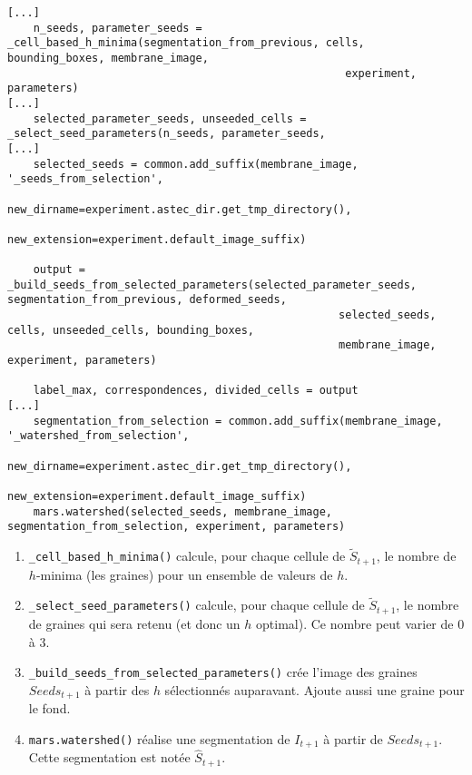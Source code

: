 \documentclass{article}
\def \mycolor {red}
\begin{document}
\color{black}
\begin{verbatim}
[...]
    n_seeds, parameter_seeds = _cell_based_h_minima(segmentation_from_previous, cells, bounding_boxes, membrane_image,
                                                    experiment, parameters)
[...]
    selected_parameter_seeds, unseeded_cells = _select_seed_parameters(n_seeds, parameter_seeds,
[...]
    selected_seeds = common.add_suffix(membrane_image, '_seeds_from_selection',
                                       new_dirname=experiment.astec_dir.get_tmp_directory(),
                                       new_extension=experiment.default_image_suffix)

    output = _build_seeds_from_selected_parameters(selected_parameter_seeds, segmentation_from_previous, deformed_seeds,
                                                   selected_seeds, cells, unseeded_cells, bounding_boxes,
                                                   membrane_image, experiment, parameters)

    label_max, correspondences, divided_cells = output
[...]
    segmentation_from_selection = common.add_suffix(membrane_image, '_watershed_from_selection',
                                                    new_dirname=experiment.astec_dir.get_tmp_directory(),
                                                    new_extension=experiment.default_image_suffix)
    mars.watershed(selected_seeds, membrane_image, segmentation_from_selection, experiment, parameters)
\end{verbatim}
\color{\mycolor}
\begin{enumerate}
\itemsep -0.5ex
\item \verb|_cell_based_h_minima()| calcule, pour chaque cellule de $\tilde{S}_{t+1}$, le nombre de $h$-minima (les graines) pour un ensemble de valeurs de $h$.

\item \verb|_select_seed_parameters()| calcule, pour chaque cellule de $\tilde{S}_{t+1}$, le nombre de graines qui sera retenu (et donc un $h$ optimal). Ce nombre peut varier de 0 \`a 3. 

\item \verb|_build_seeds_from_selected_parameters()| cr\'ee l'image des graines $Seeds_{t+1}$ \`a partir des $h$ s\'electionn\'es auparavant. Ajoute aussi une graine pour le fond.

\item \verb|mars.watershed()| r\'ealise une segmentation de $I_{t+1}$ \`a partir de $Seeds_{t+1}$. Cette segmentation est not\'ee $\hat{S}_{t+1}$.

\end{enumerate}
\end{document}
